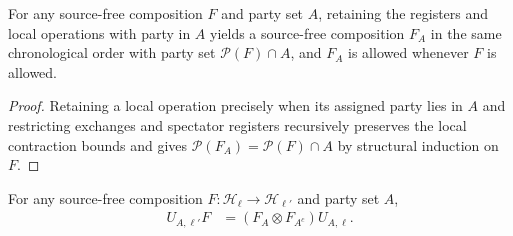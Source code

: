 \begin{lemma}
    \label{thm:peps_party_restriction}
    \leanok
    For any source-free composition $F$ and party set $A$, retaining the registers and local operations with party in $A$ yields a source-free composition $F_A$ in the same chronological order with party set $\mathcal P(F)\cap A$, and $F_A$ is allowed whenever $F$ is allowed.
\end{lemma}

\begin{proof}\leanok
    Retaining a local operation precisely when its assigned party lies in $A$ and restricting exchanges and spectator registers recursively preserves the local contraction bounds and gives $\mathcal P(F_A)=\mathcal P(F)\cap A$ by structural induction on $F$.
\end{proof}

\begin{lemma}
    \label{thm:peps_party_binary_factorization}
    \leanok
    For any source-free composition $F:\mathcal H_\ell\to\mathcal H_{\ell'}$ and party set $A$,
    \begin{align}
        U_{A,\ell'}F & =(F_A\otimes F_{A^c})U_{A,\ell}.
        \label{eq:peps_party_binary_factorization}
    \end{align}
\end{lemma}

